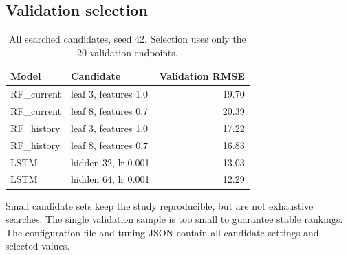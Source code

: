 \documentclass[11pt]{article}
\begin{document}
\subsection{Validation selection}
\begin{table}[H]\centering\small
\begin{tabular}{llr}\toprule
Model & Candidate & Validation RMSE \\\midrule
RF\_current & leaf 3, features 1.0 & 19.70 \\
RF\_current & leaf 8, features 0.7 & 20.39 \\
RF\_history & leaf 3, features 1.0 & 17.22 \\
RF\_history & leaf 8, features 0.7 & 16.83 \\
LSTM & hidden 32, lr 0.001 & 13.03 \\
LSTM & hidden 64, lr 0.001 & 12.29 \\
\bottomrule\end{tabular}
\caption{All searched candidates, seed 42. Selection uses only the 20 validation endpoints.}
\end{table}
Small candidate sets keep the study reproducible, but are not exhaustive searches. The single validation sample is too small to guarantee stable rankings. The configuration file and tuning JSON contain all candidate settings and selected values.
\end{document}
